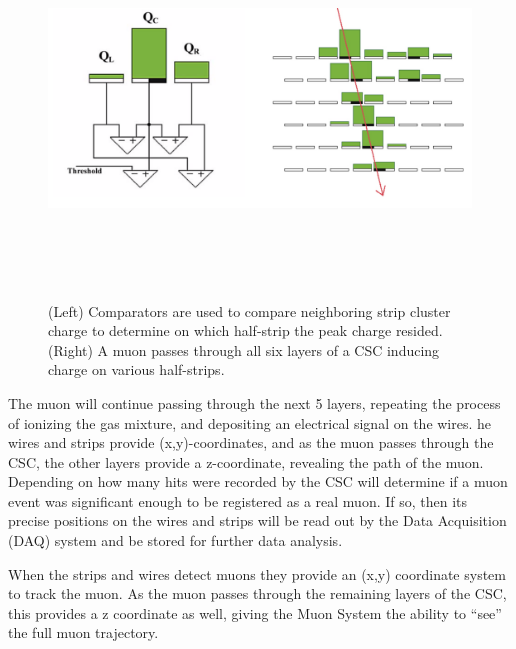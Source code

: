 \begin{figure}[pbth]
\centering
\includegraphics[width=15cm,height=10cm,keepaspectratio]{figures/cms/muonsys/csc_comparators_and_strips.png}
    \caption{
    (Left) Comparators are used to compare neighboring strip cluster charge to determine on which half-strip the peak charge resided.
    (Right) A muon passes through all six layers of a CSC inducing charge on various half-strips.
    }
    \label{fig:comparators}
\end{figure}

The muon will continue passing through the next 5 layers, repeating the process of ionizing the gas mixture, and depositing an electrical signal on the wires. 
he wires and strips provide (x,y)-coordinates, and as the muon passes through the CSC, the other layers provide a z-coordinate, revealing the path of the muon.
Depending on how many hits were recorded by the CSC will determine if a muon event was significant enough to be registered as a real muon. 
If so, then its precise positions on the wires and strips will be read out by the Data Acquisition (DAQ) system and be stored for further data analysis.

When the strips and wires detect muons they provide an (x,y) coordinate system to track the muon. 
As the muon passes through the remaining layers of the CSC, this provides a z coordinate as well, giving the Muon System the ability to ``see'' the full muon trajectory.





